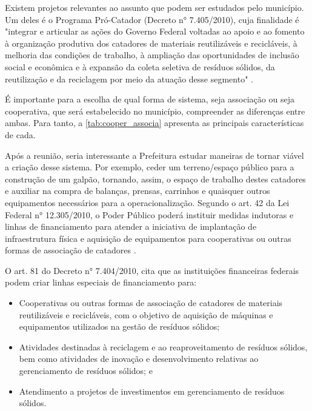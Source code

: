 Existem projetos relevantes ao assunto que podem ser estudados pelo município. Um deles é o Programa Pró-Catador (Decreto n° 7.405/2010), cuja finalidade é "integrar e articular as ações do Governo Federal voltadas ao apoio e ao fomento à organização produtiva dos catadores de materiais reutilizáveis e recicláveis, à melhoria das condições de trabalho, à ampliação das oportunidades de inclusão social e econômica e à expansão da coleta seletiva de resíduos sólidos, da reutilização e da reciclagem por meio da atuação desse segmento" \cite{brasil:7405}.

É importante para a escolha de qual forma de sistema, seja associação ou seja cooperativa, que será estabelecido no município, compreender as diferenças entre ambas. Para tanto, a \autoref{tab:cooper_associa} apresenta as principais características de cada.


\FloatBarrier

Após a reunião, seria interessante a Prefeitura estudar maneiras de tornar viável a criação desse sistema. Por exemplo, ceder um terreno/espaço público para a construção de um galpão, tornando, assim, o espaço de trabalho destes catadores e auxiliar na compra de balanças, prensas, carrinhos e quaisquer outros equipamentos necessários para a operacionalização. Segundo o art. 42 da Lei Federal n° 12.305/2010, o Poder Público poderá instituir medidas indutoras e linhas de financiamento para atender a iniciativa de implantação de infraestrutura física e aquisição de equipamentos para cooperativas ou outras formas de associação de catadores \cite{brasil:12305}.

O art. 81 do Decreto n° 7.404/2010, cita que as instituições financeiras federais podem criar linhas especiais de financiamento para:

\begin{itemize}
	\item Cooperativas ou outras formas de associação de catadores de materiais reutilizáveis e recicláveis, com o objetivo de aquisição de máquinas e equipamentos utilizados na gestão de resíduos sólidos;
	\item Atividades destinadas à reciclagem e ao reaproveitamento de resíduos sólidos, bem como atividades de inovação e desenvolvimento relativas ao gerenciamento de resíduos sólidos; e 
	\item Atendimento a projetos de investimentos em gerenciamento de resíduos sólidos.
\end{itemize}

